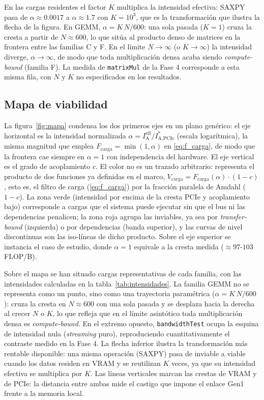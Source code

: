 \documentclass[a4paper,11pt]{article}
\begin{document}
En las cargas residentes el factor $K$ multiplica la intensidad efectiva: SAXPY pasa de $\alpha \approx 0.0017$ a
$\alpha \approx 1.7$ con $K = 10^3$, que es la transformación que ilustra la flecha de la figura. En GEMM,
$\alpha = K\,N/600$: una sola pasada ($K=1$) cruza la cresta a partir de $N \approx 600$, lo que sitúa al producto denso de
matrices en la frontera entre las familias C y F. En el límite $N \to \infty$ (o $K \to \infty$) la intensidad diverge,
$\alpha \to \infty$, de modo que toda multiplicación densa acaba siendo \textit{compute-bound} (familia F). La medida de
\texttt{matrixMul} de la Fase 4 corresponde a esta misma fila, con $N$ y $K$ no especificados en los resultados.

\subsection{Mapa de viabilidad}

La figura~\ref{fig:mapa} condensa los dos primeros ejes en un plano genérico: el eje horizontal es la intensidad
normalizada $\alpha = I_{\text{A}}^{\text{eff}} / I_{\text{A,PCIe}}^*$ (escala logarítmica), la misma magnitud que emplea
$F_{\text{carga}} = \min(1, \alpha)$ en \eqref{eq:f_carga}, de modo que la frontera cae siempre en $\alpha = 1$ con
independencia del hardware. El eje vertical es el grado de acoplamiento $c$. El color no es un trazado arbitrario: representa
el producto de dos funciones ya definidas en el marco, $V_{\text{carga}} = F_{\text{carga}}(\alpha) \cdot (1 - c)$, esto es,
el filtro de carga (\eqref{eq:f_carga}) por la fracción paralela de Amdahl ($1 - c$). La zona verde (intensidad por encima
de la cresta PCIe y acoplamiento bajo) corresponde a cargas que el sistema puede ejecutar sin que el bus ni las dependencias
penalicen; la zona roja agrupa las inviables, ya sea por \textit{transfer-bound} (izquierda) o por dependencias (banda
superior), y las curvas de nivel discontinuas son las iso-líneas de dicho producto. Sobre el eje superior se instancia el caso de
estudio, donde $\alpha = 1$ equivale a la cresta medida ($\approx 97$-$103$ FLOP/B).

Sobre el mapa se han situado cargas representativas de cada familia, con las intensidades calculadas en la
tabla~\ref{tab:intensidades}. La familia GEMM no se representa como un punto, sino como una trayectoria paramétrica
($\alpha = K\,N/600$): cruza la cresta en $N \approx 600$ con una sola pasada y se desplaza hacia la derecha al crecer $N$ o
$K$, lo que refleja que en el límite asintótico toda multiplicación densa es \textit{compute-bound}. En el extremo opuesto,
\texttt{bandwidthTest} ocupa la esquina de intensidad nula (\textit{streaming} puro), reproduciendo cuantitativamente el
contraste medido en la Fase 4. La flecha inferior ilustra la transformación más rentable disponible: una misma operación
(SAXPY) pasa de inviable a viable cuando los datos residen en VRAM y se reutilizan $K$ veces, ya que su intensidad efectiva
se multiplica por $K$. Las líneas verticales marcan las crestas de VRAM y de PCIe: la distancia entre ambas mide el castigo
que impone el enlace Gen1 frente a la memoria local.
\end{document}
